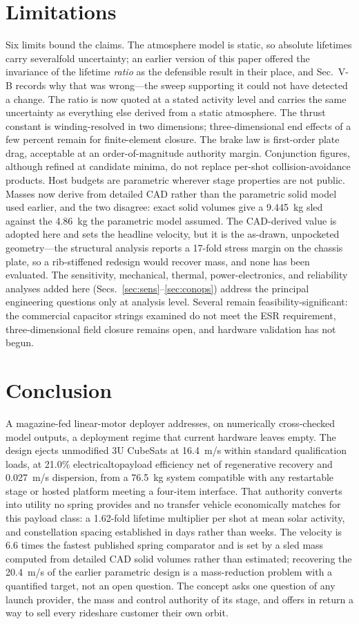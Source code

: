 \documentclass[conference]{IEEEtran}
\begin{document}
\section{Limitations}\label{sec:lim}
Six limits bound the claims. The atmosphere model is static, so absolute lifetimes carry severalfold uncertainty; an earlier version of this paper offered the invariance of the lifetime \emph{ratio} as the defensible result in their place, and Sec.~V-B records why that was wrong---the sweep supporting it could not have detected a change. The ratio is now quoted at a stated activity level and carries the same uncertainty as everything else derived from a static atmosphere. The thrust constant is winding-resolved in two dimensions; three-dimensional end effects of a few percent remain for finite-element closure. The brake law is first-order plate drag, acceptable at an order-of-magnitude authority margin. Conjunction figures, although refined at candidate minima, do not replace per-shot collision-avoidance products. Host budgets are parametric wherever stage properties are not public. Masses now derive from detailed CAD rather than the parametric solid model used earlier, and the two disagree: exact solid volumes give a 9.445~kg sled against the 4.86~kg the parametric model assumed. The CAD-derived value is adopted here and sets the headline velocity, but it is the as-drawn, unpocketed geometry---the structural analysis reports a 17-fold stress margin on the chassis plate, so a rib-stiffened redesign would recover mass, and none has been evaluated. The sensitivity, mechanical, thermal, power-electronics, and reliability analyses added here (Secs.~\ref{sec:sens}--\ref{sec:conops}) address the principal engineering questions only at analysis level. Several remain feasibility-significant: the commercial capacitor strings examined do not meet the ESR requirement, three-dimensional field closure remains open, and hardware validation has not begun.

\section{Conclusion}
A magazine-fed linear-motor deployer addresses, on numerically cross-checked model outputs, a deployment regime that current hardware leaves empty. The design ejects unmodified 3U CubeSats at 16.4~m/s within standard qualification loads, at 21.0\% electrical\-to\-payload efficiency net of regenerative recovery and 0.027~m/s dispersion, from a 76.5~kg system compatible with any restartable stage or hosted platform meeting a four-item interface. That authority converts into utility no spring provides and no transfer vehicle economically matches for this payload class: a 1.62-fold lifetime multiplier per shot at mean solar activity, and constellation spacing established in days rather than weeks. The velocity is 6.6 times the fastest published spring comparator and is set by a sled mass computed from detailed CAD solid volumes rather than estimated; recovering the 20.4~m/s of the earlier parametric design is a mass-reduction problem with a quantified target, not an open question. The concept asks one question of any launch provider, the mass and control authority of its stage, and offers in return a way to sell every rideshare customer their own orbit.
\end{document}
